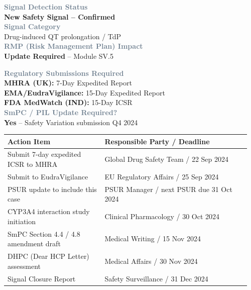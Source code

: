 \documentclass[11pt,a4paper]{scrartcl}
\newcommand{\fieldlabel}[1]{%
  \textcolor{SlateGray}{\footnotesize\textbf{#1}}%
}
\newcommand{\fieldvalue}[1]{%
  {\normalsize #1}%
}
\begin{document}
\begin{minipage}[t]{0.48\linewidth}
\fieldlabel{Signal Detection Status}\\
\fieldvalue{\textbf{New Safety Signal -- Confirmed}}\\[3pt]
\fieldlabel{Signal Category}\\
\fieldvalue{Drug-induced QT prolongation / TdP}\\[3pt]
\fieldlabel{RMP (Risk Management Plan) Impact}\\
\fieldvalue{\textbf{Update Required} -- Module SV.5}
\end{minipage}%
\hfill%
\begin{minipage}[t]{0.48\linewidth}
\fieldlabel{Regulatory Submissions Required}\\
\fieldvalue{\textbf{MHRA (UK):} 7-Day Expedited Report\\
\textbf{EMA/EudraVigilance:} 15-Day Expedited Report\\
\textbf{FDA MedWatch (IND):} 15-Day ICSR}\\[3pt]
\fieldlabel{SmPC / PIL Update Required?}\\
\fieldvalue{\textbf{Yes} -- Safety Variation submission Q4 2024}
\end{minipage}

\vspace{4mm}

\begin{tabular}{@{}L{0.38\linewidth}L{0.58\linewidth}@{}}
\toprule
{}
\small\bfseries Action Item & \small\bfseries Responsible Party / Deadline \\
\midrule
Submit 7-day expedited ICSR to MHRA & Global Drug Safety Team / 22 Sep 2024 \\
Submit to EudraVigilance & EU Regulatory Affairs / 25 Sep 2024 \\
PSUR update to include this case & PSUR Manager / next PSUR due 31 Oct 2024 \\
CYP3A4 interaction study initiation & Clinical Pharmacology / 30 Oct 2024 \\
SmPC Section 4.4 / 4.8 amendment draft & Medical Writing / 15 Nov 2024 \\
DHPC (Dear HCP Letter) assessment & Medical Affairs / 30 Nov 2024 \\
Signal Closure Report & Safety Surveillance / 31 Dec 2024 \\
\bottomrule
\end{tabular}
\end{document}
